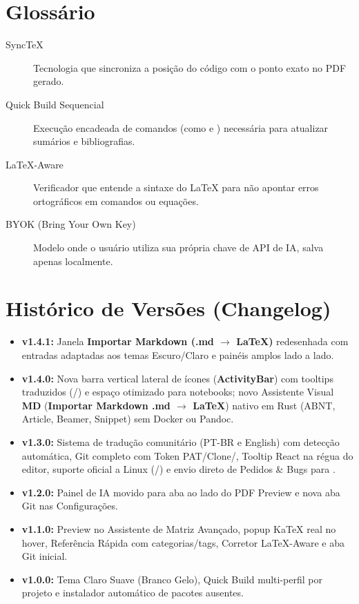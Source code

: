 \documentclass[11pt,a4paper]{article}
\begin{document}
\section{Glossário}
\begin{description}
  \item[SyncTeX] Tecnologia que sincroniza a posição do código  com o ponto exato no PDF gerado.
  \item[Quick Build Sequencial] Execução encadeada de comandos (como  e ) necessária para atualizar sumários e bibliografias.
  \item[LaTeX-Aware] Verificador que entende a sintaxe do \LaTeX{} para não apontar erros ortográficos em comandos ou equações.
  \item[BYOK (Bring Your Own Key)] Modelo onde o usuário utiliza sua própria chave de API de IA, salva apenas localmente.
\end{description}

\section{Histórico de Versões (Changelog)}
\begin{itemize}
  \item \textbf{v1.4.1:} Janela \textbf{Importar Markdown (.md $\to$ LaTeX)} redesenhada com entradas adaptadas aos temas Escuro/Claro e painéis amplos lado a lado.
  \item \textbf{v1.4.0:} Nova barra vertical lateral de ícones (\textbf{ActivityBar}) com tooltips traduzidos (/) e espaço otimizado para notebooks; novo Assistente Visual \textbf{MD} (\textbf{Importar Markdown .md $\to$ LaTeX}) nativo em Rust (ABNT, Article, Beamer, Snippet) sem Docker ou Pandoc.
  \item \textbf{v1.3.0:} Sistema de tradução comunitário (PT-BR e English) com detecção automática, Git completo com Token PAT/Clone/, Tooltip React na régua do editor, suporte oficial a Linux (/) e envio direto de Pedidos \& Bugs para .
  \item \textbf{v1.2.0:} Painel de IA movido para aba ao lado do PDF Preview e nova aba Git nas Configurações.
  \item \textbf{v1.1.0:} Preview no Assistente de Matriz Avançado, popup KaTeX real no hover, Referência Rápida com categorias/tags, Corretor LaTeX-Aware e aba Git inicial.
  \item \textbf{v1.0.0:} Tema Claro Suave (Branco Gelo), Quick Build multi-perfil por projeto e instalador automático de pacotes  ausentes.
\end{itemize}
\end{document}
